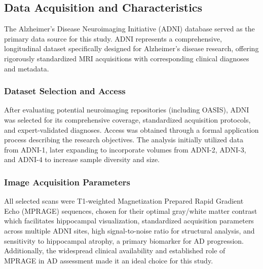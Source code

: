 \documentclass[12pt, a4paper]{article}
\begin{document}



\subsection{Data Acquisition and Characteristics}

The Alzheimer's Disease Neuroimaging Initiative (ADNI) database served as the primary data source for this study. ADNI represents a comprehensive, longitudinal dataset specifically designed for Alzheimer's disease research, offering rigorously standardized MRI acquisitions with corresponding clinical diagnoses and metadata.

\subsubsection{Dataset Selection and Access}

After evaluating potential neuroimaging repositories (including OASIS), ADNI was selected for its comprehensive coverage, standardized acquisition protocols, and expert-validated diagnoses. Access was obtained through a formal application process describing the research objectives. The analysis initially utilized data from ADNI-1, later expanding to incorporate volumes from ADNI-2, ADNI-3, and ADNI-4 to increase sample diversity and size.

\subsubsection{Image Acquisition Parameters}

All selected scans were T1-weighted Magnetization Prepared Rapid Gradient Echo (MPRAGE) sequences, chosen for their optimal gray/white matter contrast which facilitates hippocampal visualization, standardized acquisition parameters across multiple ADNI sites, high signal-to-noise ratio for structural analysis, and sensitivity to hippocampal atrophy, a primary biomarker for AD progression. Additionally, the widespread clinical availability and established role of MPRAGE in AD assessment made it an ideal choice for this study.
\end{document}
